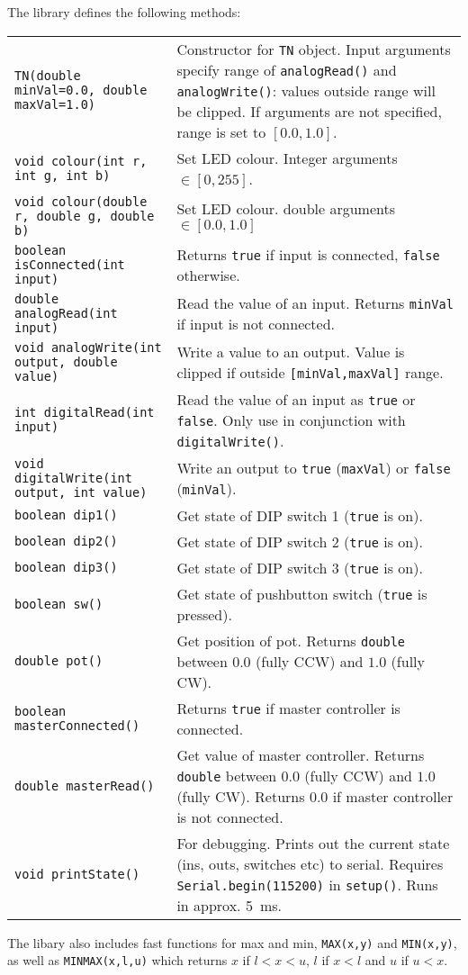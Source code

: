 \documentclass[a4paper,10pt]{article}
\begin{document}
The library defines the following methods:
\begin{table}[h!]
\begin{tabular}{l p{9cm} }
\verb+TN(double minVal=0.0, double maxVal=1.0)+ & Constructor for \verb|TN| object.  Input arguments specify range of \verb|analogRead()| and \verb|analogWrite()|: values outside range will be clipped.  If arguments are not specified, range is set to $[0.0,1.0]$.\\
\verb+void colour(int r, int g, int b)+ & Set LED colour.  Integer arguments $\in [0,255]$.  \\
\verb+void colour(double r, double g, double b)+ & Set LED colour.  double arguments $\in [0.0,1.0]$ \\
\verb+boolean isConnected(int input)+ & Returns \verb|true| if input is connected, \verb|false| otherwise.\\
\verb+double analogRead(int input)+ & Read the value of an input.  Returns \verb|minVal| if input is not connected.\\
\verb+void analogWrite(int output, double value)+ & Write a value to an output.  Value is clipped if outside \verb|[minVal,maxVal]| range.\\
\verb+int digitalRead(int input)+ & Read the value of an input as \verb|true| or \verb|false|.  Only use in conjunction with \verb|digitalWrite()|.\\
\verb+void digitalWrite(int output, int value)+ & Write an output to \verb|true| (\verb|maxVal|) or \verb|false| (\verb|minVal|). \\
\verb+boolean dip1()+ & Get state of DIP switch 1 (\verb|true| is on).\\
\verb+boolean dip2()+ & Get state of DIP switch 2 (\verb|true| is on).\\
\verb+boolean dip3()+ & Get state of DIP switch 3 (\verb|true| is on).\\
\verb+boolean sw()+ & Get state of pushbutton switch (\verb|true| is pressed).\\
\verb+double pot()+ & Get position of pot.  Returns \verb|double| between $0.0$ (fully CCW) and $1.0$ (fully CW).\\
\verb+boolean masterConnected()+ & Returns \verb|true| if master controller is connected.  \\
\verb+double masterRead()+ & Get value of master controller.  Returns \verb|double| between $0.0$ (fully CCW) and $1.0$ (fully CW).  Returns $0.0$ if master controller is not connected. \\
\verb+void printState()+ & For debugging.  Prints out the current state (ins, outs, switches etc) to serial.  Requires \verb|Serial.begin(115200)| in \verb|setup()|.  Runs in approx. 5~ms.
\end{tabular}
\end{table}

The libary also includes fast functions for max and min, \verb|MAX(x,y)| and \verb|MIN(x,y)|, as well as \verb|MINMAX(x,l,u)| which returns $x$ if $l<x<u$, $l$ if $x < l$ and $u$ if $u<x$.
\end{document}
